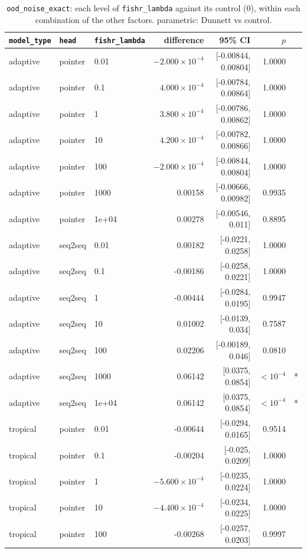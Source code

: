 \documentclass[10pt]{article}
\begin{document}
{\small
\begin{longtable}{lllrrrl}
\caption{\texttt{ood\_noise\_exact}: each level of \texttt{fishr\_lambda} against its control (0), within each combination of the other factors. parametric: Dunnett vs control.}\label{tab:control-ood_noise_exact}\\
\toprule
\texttt{model\_type} & \texttt{head} & \texttt{fishr\_lambda} & difference & 95\% CI & $p$ & \\
\midrule
\endhead
adaptive & pointer & 0.01 & $-2.000\times10^{-4}$ & [-0.00844, 0.00804] & 1.0000 & \\
adaptive & pointer & 0.1 & $4.000\times10^{-4}$ & [-0.00784, 0.00864] & 1.0000 & \\
adaptive & pointer & 1 & $3.800\times10^{-4}$ & [-0.00786, 0.00862] & 1.0000 & \\
adaptive & pointer & 10 & $4.200\times10^{-4}$ & [-0.00782, 0.00866] & 1.0000 & \\
adaptive & pointer & 100 & $-2.000\times10^{-4}$ & [-0.00844, 0.00804] & 1.0000 & \\
adaptive & pointer & 1000 & 0.00158 & [-0.00666, 0.00982] & 0.9935 & \\
adaptive & pointer & 1e+04 & 0.00278 & [-0.00546, 0.011] & 0.8895 & \\
adaptive & seq2seq & 0.01 & 0.00182 & [-0.0221, 0.0258] & 1.0000 & \\
adaptive & seq2seq & 0.1 & -0.00186 & [-0.0258, 0.0221] & 1.0000 & \\
adaptive & seq2seq & 1 & -0.00444 & [-0.0284, 0.0195] & 0.9947 & \\
adaptive & seq2seq & 10 & 0.01002 & [-0.0139, 0.034] & 0.7587 & \\
adaptive & seq2seq & 100 & 0.02206 & [-0.00189, 0.046] & 0.0810 & \\
adaptive & seq2seq & 1000 & 0.06142 & [0.0375, 0.0854] & $<10^{-4}$ & *\\
adaptive & seq2seq & 1e+04 & 0.06142 & [0.0375, 0.0854] & $<10^{-4}$ & *\\
tropical & pointer & 0.01 & -0.00644 & [-0.0294, 0.0165] & 0.9514 & \\
tropical & pointer & 0.1 & -0.00204 & [-0.025, 0.0209] & 1.0000 & \\
tropical & pointer & 1 & $-5.600\times10^{-4}$ & [-0.0235, 0.0224] & 1.0000 & \\
tropical & pointer & 10 & $-4.400\times10^{-4}$ & [-0.0234, 0.0225] & 1.0000 & \\
tropical & pointer & 100 & -0.00268 & [-0.0257, 0.0203] & 0.9997 & \\

\end{longtable}}
\end{document}
